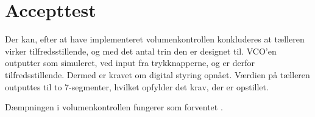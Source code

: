 \section{Accepttest}
\label{volumenkontrol-accepttest}
Der kan, efter at have implementeret volumenkontrollen konkluderes at tælleren virker tilfredsstillende, og med det antal trin den er designet til. VCO'en outputter som simuleret, ved input fra trykknapperne, og er derfor tilfredsstillende. Dermed er kravet om digital styring opnået. Værdien på tælleren outputtes til to 7-segmenter, hvilket opfylder det krav, der er opstillet.

Dæmpningen i volumenkontrollen fungerer som forventet . 